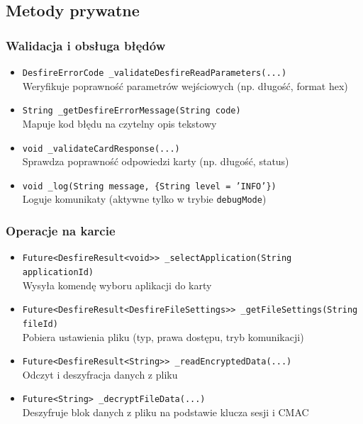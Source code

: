\documentclass[a4paper,12pt]{article}
\begin{document}
\subsection{Metody prywatne}

\subsubsection*{Walidacja i obsługa błędów}
\begin{itemize}
    \item \texttt{DesfireErrorCode \_validateDesfireReadParameters(...)}\\
    Weryfikuje poprawność parametrów wejściowych (np. długość, format hex)
    
    \item \texttt{String \_getDesfireErrorMessage(String code)}\\
    Mapuje kod błędu na czytelny opis tekstowy
    
    \item \texttt{void \_validateCardResponse(...)}\\
    Sprawdza poprawność odpowiedzi karty (np. długość, status)
    
    \item \texttt{void \_log(String message, \{String level = 'INFO'\})}\\
    Loguje komunikaty (aktywne tylko w trybie \texttt{debugMode})
\end{itemize}

\subsubsection*{Operacje na karcie}
\begin{itemize}
    \item \texttt{Future<DesfireResult<void>> \_selectApplication(String applicationId)}\\
    Wysyła komendę wyboru aplikacji do karty
    
    \item \texttt{Future<DesfireResult<DesfireFileSettings>> \_getFileSettings(String fileId)}\\
    Pobiera ustawienia pliku (typ, prawa dostępu, tryb komunikacji)
    
    \item \texttt{Future<DesfireResult<String>> \_readEncryptedData(...)}\\
    Odczyt i deszyfracja danych z pliku
    
    \item \texttt{Future<String> \_decryptFileData(...)}\\
    Deszyfruje blok danych z pliku na podstawie klucza sesji i CMAC
\end{itemize}
\end{document}
